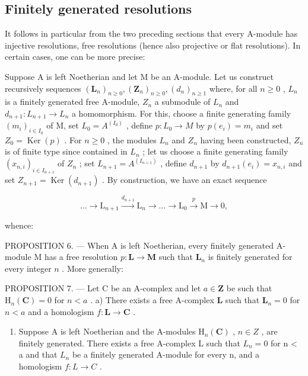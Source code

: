 \subsection{Finitely generated resolutions}

It follows in particular from the two preceding sections that every A-module has injective resolutions, free resolutions (hence also projective or flat resolutions). In certain cases, one can be more precise:

Suppose A is left Noetherian and let M be an A-module. Let us construct recursively sequences \((\mathbf{L}_{n})_{n\geqslant0},(\mathbf{Z}_{n})_{n\geqslant0},(d_{n})_{n\geqslant1}\) where, for all \(n\geqslant0\) , \(L_{n}\) is a finitely generated free A-module, \(Z_{n}\) a submodule of \(L_{n}\) and \(d_{n+1}:L_{n+1}\to L_{n}\) a homomorphism. For this, choose a finite generating family \((m_{i})_{i\in I_{0}}\) of M, set \(L_{0}=A^{(I_{0})}\) , define \(p:L_{0}\to M\) by \(p(e_{i})=m_{i}\) and set \(Z_{0}=\operatorname{Ker}(p)\) . For \(n\geqslant0\) , the modules \(L_{n}\) and \(Z_{n}\) having been constructed, \(Z_{n}\) is of finite type since contained in \(L_{n}\) ; let us choose a finite generating family \((x_{n,i})_{i\in I_{n+1}}\) of \(Z_{n}\) ; set \(L_{n+1}=A^{(I_{n+1})}\) , define \(d_{n+1}\) by \(d_{n+1}(e_{i})=x_{n,i}\) and set \(Z_{n+1}=\operatorname{Ker}(d_{n+1})\) . By construction, we have an exact sequence

\[
\dots \longrightarrow \mathrm{L} _ {n + 1} \xrightarrow {d _ {n + 1}} \mathrm{L} _ {n} \longrightarrow \dots \longrightarrow \mathrm{L} _ {0} \xrightarrow {p} \mathrm{M} \longrightarrow 0,
\]

whence:

PROPOSITION 6. --- When A is left Noetherian, every finitely generated A-module M has a free resolution \(p: \mathbf{L} \to \mathbf{M}\) such that \(\mathbf{L}_n\) is finitely generated for every integer \(n\) . More generally:

PROPOSITION 7. --- Let C be an A-complex and let \(a \in \mathbf{Z}\) be such that \(\mathrm{H}_{n}(\mathbf{C}) = 0\) for \(n < a\) . a) There exists a free A-complex \(\mathbf{L}\) such that \(\mathbf{L}_{n} = 0\) for \(n < a\) and a homologism \(f: \mathbf{L} \to \mathbf{C}\) .

\begin{enumerate}
\def\labelenumi{\alph{enumi})}
\setcounter{enumi}{1}
\tightlist
\item
  Suppose A is left Noetherian and the A-modules \(\mathrm{H}_{n}(\mathbf{C})\) , \(n \in Z\) , are finitely generated. There exists a free A-complex L such that \(L_{n} = 0\) for n \textless{} a and that \(L_{n}\) be a finitely generated A-module for every n, and a homologism \(f: L \to C\) .
\end{enumerate}

